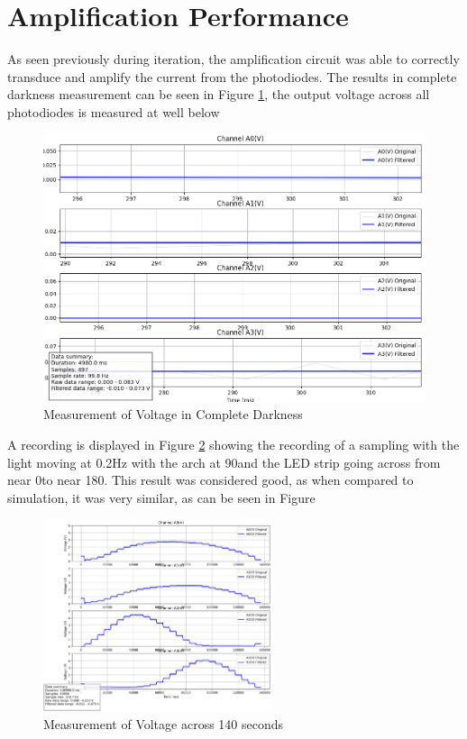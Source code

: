 \section{Amplification Performance}
As seen previously during iteration, the amplification circuit was able to correctly transduce and amplify the current from the photodiodes. The results in complete darkness measurement can be seen in Figure \ref{fig:ampPerf}, the output voltage across all photodiodes is measured at well below 


\begin{figure}[htb]
    \centering
    \includegraphics[width=1\textwidth]{chapters/results/images/result_amplification_perf.png}
    \caption{Measurement of Voltage in Complete Darkness}
    \label{fig:ampPerf}
\end{figure}

A recording is displayed in Figure \ref{fig:recZoom} showing the recording of a sampling with the light moving at 0.2Hz with the arch at 90\textdegree and the LED strip going across from near 0\textdegree to near 180\textdegree. This result was considered good, as when compared to simulation, it was very similar, as can be seen in Figure
\begin{figure}[htb]
    \centering
    \includegraphics[width=0.6\textwidth]{chapters/results/images/120s_zoomed.png}
    \caption{Measurement of Voltage across 140 seconds}
    \label{fig:recZoom}
\end{figure}

